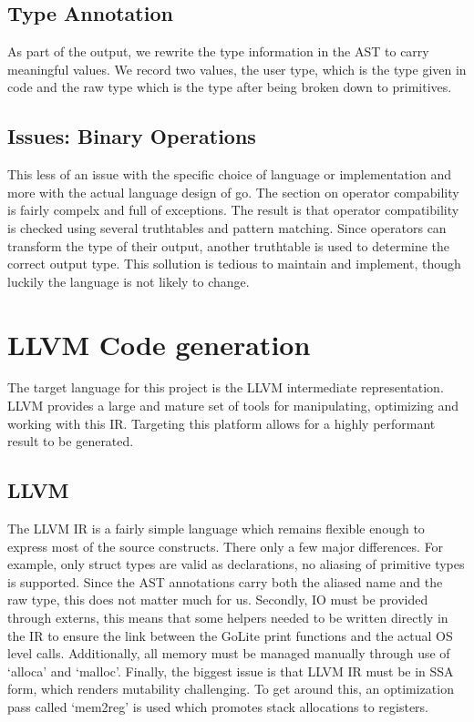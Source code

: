 \documentclass[11pt]{article}
\begin{document}
\subsection{Type Annotation}

As part of the output, we rewrite the type information in the AST to carry meaningful values. We record two values, the user type, which is the type given in code and the raw type which is the type after being broken down to primitives. 

\subsection{Issues: Binary Operations}

This less of an issue with the specific choice of language or implementation and more with the actual language design of go. The section on operator compability is fairly compelx and full of exceptions. The result is that operator compatibility is checked using several truthtables and pattern matching. Since operators can transform the type of their output, another truthtable is used to determine the correct output type. This sollution is tedious to maintain and implement, though luckily the language is not likely to change. 

\section{LLVM Code generation}

The target language for this project is the LLVM intermediate representation. LLVM provides a large and mature set of tools for manipulating, optimizing and working with this IR. Targeting this platform allows for a highly performant result to be generated. 

\subsection{LLVM}

The LLVM IR is a fairly simple language which remains flexible enough to express most of the source constructs. There only a few major differences. For example, only struct types are valid as declarations, no aliasing of primitive types is supported. Since the AST annotations carry both the aliased name and the raw type, this does not matter much for us. 
Secondly, IO must be provided through externs, this means that some helpers needed to be written directly in the IR to ensure the link between the GoLite print functions and the actual OS level calls. Additionally, all memory must be managed manually through use of `alloca' and `malloc'. 
Finally, the biggest issue is that LLVM IR must be in SSA form, which renders mutability challenging. To get around this, an optimization pass called `mem2reg' is used which promotes stack allocations to registers.
\end{document}
